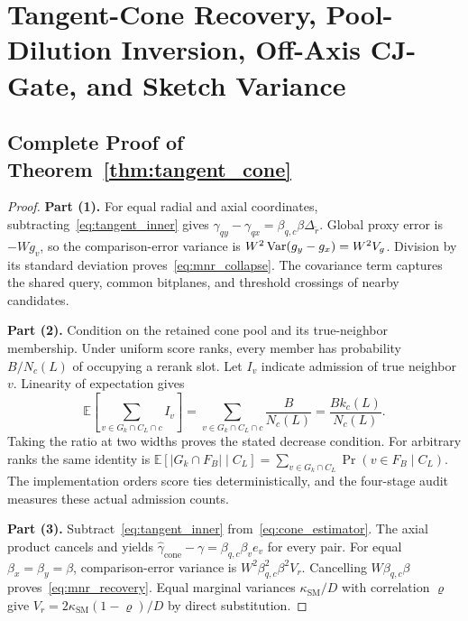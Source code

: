 \section{Tangent-Cone Recovery, Pool-Dilution Inversion, Off-Axis CJ-Gate, and Sketch Variance}
\label{app:tangent_cone}

\subsection{Complete Proof of Theorem~\ref{thm:tangent_cone}}
\begin{proof}
\textbf{Part (1).}
For equal radial and axial coordinates, subtracting~\eqref{eq:tangent_inner} gives $\gamma_{qy}-\gamma_{qx}=\beta_{q,c}\beta\Delta_{\tilde r}$. Global proxy error is $-Wg_v$, so the comparison-error variance is $W^2\operatorname{Var}(g_y-g_x)=W^2V_g$. Division by its standard deviation proves~\eqref{eq:mnr_collapse}. The covariance term captures the shared query, common bitplanes, and threshold crossings of nearby candidates.

\textbf{Part (2).}
Condition on the retained cone pool and its true-neighbor membership. Under uniform score ranks, every member has probability $B/N_c(L)$ of occupying a rerank slot. Let $I_v$ indicate admission of true neighbor $v$. Linearity of expectation gives
\begin{equation}
 \mathbb E\!\left[\sum_{v\in G_k\cap C_L\cap c}I_v\right]
 =\sum_{v\in G_k\cap C_L\cap c}\frac{B}{N_c(L)}
 =\frac{B k_c(L)}{N_c(L)}.
\end{equation}
Taking the ratio at two widths proves the stated decrease condition. For arbitrary ranks the same identity is $\mathbb E[|G_k\cap F_B|\mid C_L]=\sum_{v\in G_k\cap C_L}\Pr(v\in F_B\mid C_L)$. The implementation orders score ties deterministically, and the four-stage audit measures these actual admission counts.

\textbf{Part (3).}
Subtract~\eqref{eq:tangent_inner} from~\eqref{eq:cone_estimator}. The axial product cancels and yields $\hat\gamma_{\mathrm{cone}}-\gamma=\beta_{q,c}\beta_v e_v$ for every pair. For equal $\beta_x=\beta_y=\beta$, comparison-error variance is $W^2\beta_{q,c}^2\beta^2V_r$. Cancelling $W\beta_{q,c}\beta$ proves~\eqref{eq:mnr_recovery}. Equal marginal variances $\kappa_{\mathrm{SM}}/D$ with correlation $\varrho$ give $V_r=2\kappa_{\mathrm{SM}}(1-\varrho)/D$ by direct substitution.
\end{proof}

